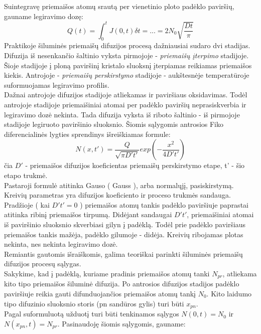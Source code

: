 \documentclass[11pt,a4paper]{article}
\begin{document}
Suintegravę priemaišos atomų srautą per vienetinio ploto padėklo paviršių, gauname legiravimo dozę:
\begin{equation}
Q(t) = \int^{t}_{0}J(0,t)\delta t = ... = 2N_0 \sqrt{\frac{Dt}{\pi}} 
\end{equation}
Praktikoje šiluminės priemaišų difuzijos procesą dažniausiai sudaro dvi stadijas. Difuzija iš nesenkančio šaltinio vyksta pirmojoje - \emph{priemaišų įterpimo} stadijoje. Šioje stadijoje į ploną paviršinį kristalo sluoksnį įterpiamas reikiamas priemaišos kiekis. Antrojoje - \emph{priemaišų perskirstymo} stadijoje - aukštesnėje temperatūroje suformuojamas legiravimo profilis.\\
Dažnai antrojoje difuzijos stadijoje atliekamas ir paviršiaus oksidavimas. Todėl antrojoje stadijoje priemaišiniai atomai per padėklo paviršių neprasiskverbia ir legiravimo dozė nekinta. Tada difuzija vyksta iš riboto šaltinio - iš pirmojoje stadijoje legiruoto paviršinio sluoksnio. Šiomis sąlygomis antrosios Fiko diferencialinės lygties sprendinys išreiškiamas formule:
\begin{equation}
N(x,t') = \frac{Q}{\sqrt{\pi D't'}} exp \left (-\frac{x^2}{4D't'} \right ) 
\end{equation}
čia $D'$ - priemaišos difuzijos koeficientas priemaišų perskirstymo etape, t' - šio etapo trukmė.\\
Pastaroji formulė atitinka Gauso ( Gauss ), arba normalųjį, pasiskirstymą. Kreivių parametras yra difuzijos koeficiento ir proceso trukmės sandauga. Pradžioje ( kai $D't' = 0$ ) priemaišos atomų tankis padėklo paviršiuje paprastai atitinka ribinį priemaišos tirpumą. Didėjant sandaugai $D't'$, priemaišiniai atomai iš paviršinio sluoksnio skverbiasi gilyn į padėklą. Todėl prie padėklo paviršiaus priemaišos tankis mažėja, padėklo gilumoje - didėja. Kreivių ribojamas plotas nekinta, nes nekinta legiravimo dozė.\\
Remiantis gautomis išraiškomis, galima teoriškai parinkti šiluminės priemaišų difuzijos procesų sąlygas.\\
Sakykime, kad į padėklą, kuriame pradinis priemaišos atomų tanki $N_{pr}$, atliekama kito tipo priemaišos šiluminė difuzija. Po antrosios difuzijos stadijos padėklo paviršiuje reikia gauti difunduojančios priemaišos atomų tankį $N_0$. Kito laidumo tipo difuzinio sluoksnio storis (pn sandūros gylis) turi būti $x_{pn}$.\\
Pagal suformuluotą užduotį turi būti tenkinamos sąlygos $N(0,t) = N_0$ ir $N(x_{pn},t) = N_{pr}$. Pasinaudoję šiomis sąlygomis, gauname:\\
\end{document}
